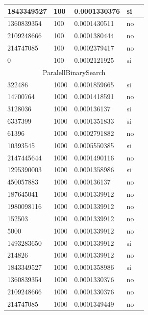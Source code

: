 \documentclass[12pt, fleqn]{article}                             %
\theoremstyle{break}                                            %
\begin{document}
\begin{longtable}{|m{5em}|m{5em}|m{10em}|m{5em}|@{}m{0pt}@{}}
            1843349527& 100  & 0.0001330376 & si &\\[1em]    \hline
            1360839354& 100  & 0.0001430511 & no &\\[1em]    \hline
            2109248666& 100  & 0.0001380444 & no &\\[1em]    \hline
            214747085& 100  & 0.0002379417 & no &\\[1em]    \hline
            0& 100  & 0.0002121925 & si &\\[1em]    \hline
            \multicolumn{5}{|c|}{ParalellBinarySearch}   \\          \hline
            322486& 1000  & 0.0001859665 & si &\\[1em]    \hline
            14700764& 1000  & 0.0001418591 & no &\\[1em]    \hline
            3128036& 1000  & 0.000136137 & si &\\[1em]    \hline
            6337399& 1000  & 0.0001351833 & si &\\[1em]    \hline
            61396& 1000  & 0.0002791882 & no &\\[1em]    \hline
            10393545& 1000  & 0.0005550385 & si &\\[1em]    \hline
            2147445644& 1000  & 0.0001490116 & no &\\[1em]    \hline
            1295390003& 1000  & 0.0001358986 & si &\\[1em]    \hline
            450057883& 1000  & 0.000136137 & no &\\[1em]    \hline
            187645041& 1000  & 0.0001339912 & no &\\[1em]    \hline
            1980098116& 1000  & 0.0001339912 & no &\\[1em]    \hline
            152503& 1000  & 0.0001339912 & no &\\[1em]    \hline
            5000& 1000  & 0.0001339912 & no &\\[1em]    \hline
            1493283650& 1000  & 0.0001339912 & si &\\[1em]    \hline
            214826& 1000  & 0.0001339912 & no &\\[1em]    \hline
            1843349527& 1000  & 0.0001358986 & si &\\[1em]    \hline
            1360839354& 1000  & 0.0001330376 & no &\\[1em]    \hline
            2109248666& 1000  & 0.0001330376 & no &\\[1em]    \hline
            214747085& 1000  & 0.0001349449 & no &\\[1em]    \hline

\end{longtable}
\end{document}
